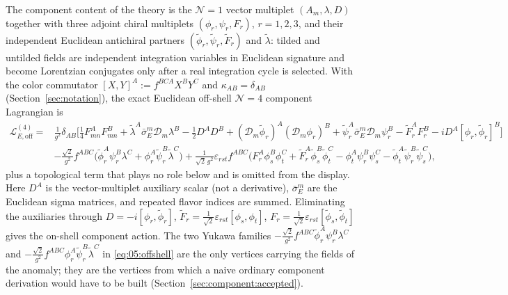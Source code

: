 The component content of the theory is the $\mathcal N=1$ vector multiplet
$(A_m,\lambda,D)$ together with three adjoint chiral multiplets
$(\phi_r,\psi_r,F_r)$, $r=1,2,3$, and their independent Euclidean antichiral
partners $(\widetilde\phi_r,\widetilde\psi_r,\widetilde F_r)$ and
$\widetilde\lambda$: tilded and untilded fields are independent integration
variables in Euclidean signature and become Lorentzian conjugates only after a
real integration cycle is selected. With the color commutator
$[X,Y]^A:=f^{BCA}X^BY^C$ and $\kappa_{AB}=\delta_{AB}$
(Section~\ref{sec:notation}), the exact Euclidean off-shell $\mathcal N=4$
component Lagrangian is
\begin{equation}\label{eq:05:offshell}
\boxed{
\begin{aligned}
\mathcal L_{E,\mathrm{off}}^{(4)}={}&
\frac{1}{g^{2}}\delta_{AB}\Big[
\frac14 F_{mn}^{A}F_{mn}^{B}
+\widetilde\lambda^{A}\bar\sigma_E^{m}\mathcal D_m\lambda^{B}
-\frac12 D^{A}D^{B}
+(\mathcal D_m\widetilde\phi_r)^{A}(\mathcal D_m\phi_r)^{B}
+\widetilde\psi_r^{A}\bar\sigma_E^{m}\mathcal D_m\psi_r^{B}
-\widetilde F_r^{A}F_r^{B}
-iD^{A}[\phi_r,\widetilde\phi_r]^{B}\Big]\\
&-\frac{\sqrt2}{g^{2}}f^{ABC}
\big(\widetilde\phi_r^{A}\psi_r^{B}\lambda^{C}
+\phi_r^{A}\widetilde\psi_r^{B}\widetilde\lambda^{C}\big)
+\frac{1}{\sqrt2\,g^{2}}\varepsilon_{rst}f^{ABC}
\big(F_r^{A}\phi_s^{B}\phi_t^{C}
+\widetilde F_r^{A}\widetilde\phi_s^{B}\widetilde\phi_t^{C}
-\phi_t^{A}\psi_r^{B}\psi_s^{C}
-\widetilde\phi_t^{A}\widetilde\psi_r^{B}\widetilde\psi_s^{C}\big),
\end{aligned}}
\end{equation}
plus a topological term that plays no role below and is omitted from the
display. Here $D^A$ is the vector-multiplet auxiliary scalar (not a
derivative), $\bar\sigma_E^m$ are the Euclidean sigma matrices, and repeated
flavor indices are summed. Eliminating the auxiliaries through
$D=-i[\phi_r,\widetilde\phi_r]$,
$\widetilde F_r=\tfrac{1}{\sqrt2}\varepsilon_{rst}[\phi_s,\phi_t]$,
$F_r=\tfrac{1}{\sqrt2}\varepsilon_{rst}[\widetilde\phi_s,\widetilde\phi_t]$
gives the on-shell component action. The two Yukawa families
$-\frac{\sqrt2}{g^2}f^{ABC}\widetilde\phi_r^A\psi_r^B\lambda^C$ and
$-\frac{\sqrt2}{g^2}f^{ABC}\phi_r^A\widetilde\psi_r^B\widetilde\lambda^C$
in \eqref{eq:05:offshell} are the only vertices carrying the fields of the
anomaly; they are the vertices from which a naive ordinary component
derivation would have to be built (Section~\ref{sec:component:accepted}).


